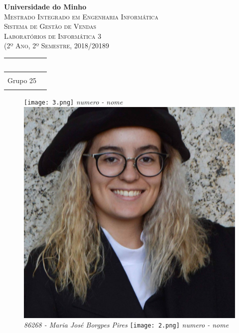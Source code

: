 \documentclass[a4paper]{report} %
\begin{document}
\begin{titlepage}

\begin{center}
    {\huge {\bf Universidade do Minho}}\\[0.4cm]
    \vspace{0.5cm}
    \textsc{\huge{Mestrado Integrado em Engenharia Informática}}\\[1.0cm]
    \vspace{2.0cm}
    \textsc{\huge{Sistema de Gestão de Vendas}}\\[0.5cm]
    \vspace{0.5cm}
    \textsc{Laboratórios de Informática 3}\\[0.5cm]
    \textsc{(2º Ano, 2º Semestre, 2018/20189}\\[0.5cm]
    \vspace{0.5cm}
    

\begin{table}[h]
\centering
\begin{tabular}{lr}\

\\ \hline
\\
\Large{Grupo 25}\\

 \\ \hline

\end{tabular}
\end{table}



\begin{figure}[!htb]
  \texttt{[image: 3.png]}
  \textit{numero - nome}
\endminipage\hfill
{}
  \includegraphics[width=\linewidth]{Pics/86268.jpg}
  \textit{86268 - Maria José Borgpes Pires}
\endminipage\hfill
{}%
  \texttt{[image: 2.png]}
  \textit{numero - nome}
\endminipage
\end{figure}


\end{center}
\end{titlepage}
\end{document}
